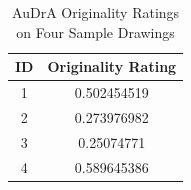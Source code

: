 \documentclass[../Proposal.tex]{subfiles}
\begin{document}
\begin{table}[htbp]
    \centering
    \begin{tabular}{c c} 
        \hline
        ID & Originality Rating \\ 
        \hline
        1 & 0.502454519 \\ 
        2 & 0.273976982 \\
        3 & 0.25074771 \\
        4 & 0.589645386 \\
        \hline
    \end{tabular}
    \caption{AuDrA Originality Ratings on Four Sample Drawings}
    \label{tab: audra_sample_rating}
\end{table}

\end{document}
